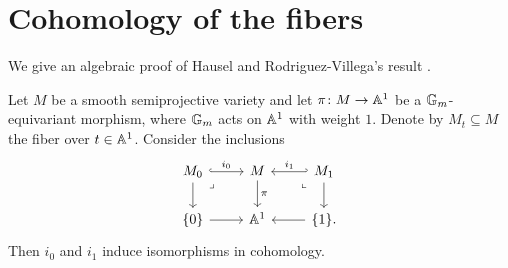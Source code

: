 \section{Cohomology of the fibers}
We give an algebraic proof of Hausel and Rodriguez-Villega's result \cite[Corollary 1.3.3]{Hausel-RodriguezVillega}.

\begin{thm}
Let $M$ be a smooth semiprojective variety and let $\pi\colon M \to \mathbb{A}^1$ be a $\mathbb{G}_m$-equivariant morphism, where $\mathbb{G}_m$ acts on $\mathbb{A}^1$ with weight $1$. Denote by $M_t \subseteq M$ the fiber over $t \in \mathbb{A}^1$. Consider the inclusions
\[\begin{tikzcd}
	{M_0} & M & {M_{1}} \\
	{\{ 0 \}} & {\Ab^1} & {\{1\}.}
	\arrow["i_0", hook, from=1-1, to=1-2]
	\arrow[from=1-1, to=2-1]
	\arrow["\lrcorner"{anchor=center, pos=0.125}, draw=none, from=1-1, to=2-2]
	\arrow["\pi", from=1-2, to=2-2]
	\arrow["i_1"', hook', from=1-3, to=1-2]
	\arrow["\lrcorner"{anchor=center, pos=0.125, rotate=-90}, draw=none, from=1-3, to=2-2]
	\arrow[from=1-3, to=2-3]
	\arrow[from=2-1, to=2-2]
	\arrow[from=2-3, to=2-2]
\end{tikzcd}\]
Then $i_0$ and $i_1$ induce isomorphisms in cohomology.
\end{thm}

